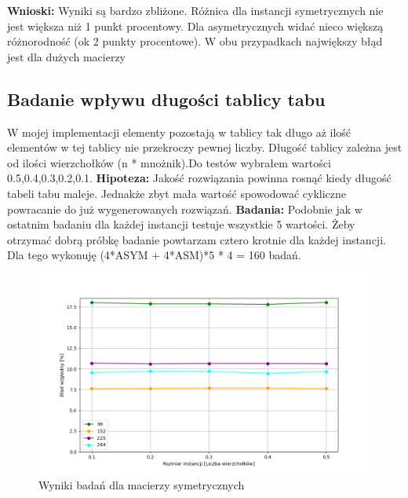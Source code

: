\documentclass{article}
\begin{document}
        \FloatBarrier
        \textbf{Wnioski: } Wyniki są bardzo zbliżone. Różnica dla instancji
        symetrycznych nie jest większa niż 1 punkt procentowy. Dla asymetrycznych
        widać nieco większą różnorodność (ok 2 punkty procentowe). W obu przypadkach
        największy błąd jest dla dużych macierzy
      \subsection{Badanie wpływu długości tablicy tabu} 
        W mojej implementacji elementy pozostają w tablicy tak długo aż 
        ilość elementów w tej tablicy nie przekroczy pewnej liczby. Długość
        tablicy zależna jest od ilości wierzchołków (n * mnożnik).Do testów
        wybrałem wartości 0.5,0.4,0.3,0.2,0.1.\linebreak
        \textbf{Hipoteza: } Jakość rozwiązania powinna rosnąć kiedy długość
        tabeli tabu maleje. Jednakże zbyt mała wartość spowodować cykliczne 
        powracanie do już wygenerowanych rozwiązań.\linebreak
        \textbf{Badania: } Podobnie jak w ostatnim badaniu dla każdej instancji 
        testuje wszystkie 5 wartości. Żeby otrzymać dobrą próbkę badanie 
        powtarzam cztero krotnie dla każdej instancji. Dla tego wykonuję 
        (4*ASYM + 4*ASM)*5 * 4 = 160 badań.\linebreak
        \FloatBarrier
        
        \FloatBarrier
        \begin{figure}[ht]
          \centering
          \includegraphics[width=\textwidth]{src/plots/symTsTabuLen.png}
          \caption{Wyniki badań dla macierzy symetrycznych}
          \label{fig:symTabuLen}
        \end{figure}
\end{document}
